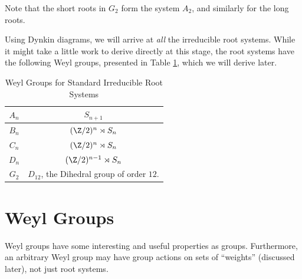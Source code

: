 \documentclass[11pt,leqno,oneside]{amsart}
\numberwithin{thm}{section}
\newcommand{\halfsum}{\rho}
\begin{document}
\begin{rmk}
  Note that the short roots in \(G_2\) form the system \(A_2\), and
  similarly for the long roots.
\end{rmk}
Using Dynkin diagrams, we will arrive at \emph{all}
the irreducible root systems. While it might take a little work to
derive directly at this stage, the root systems
have the following Weyl groups, presented in Table
\ref{tab:wely-groups}, which we will derive later. \\
\begin{table}
  \centering
  \begin{tabular}{|c|c|}
  \hline \(A_n\) & \(S_{n+1}\) \\
  \hline \(B_n\) & \((\Z/2)^n \rtimes S_n\) \\
  \hline \(C_n\) & \((\Z/2)^n \rtimes S_n\)\\
  \hline \(D_n\) & \((\Z/2)^{n-1} \rtimes S_n\) \\
  \hline \(G_2\) & \(D_{12}\), the Dihedral group of order \(12\). \\
  \hline
  \end{tabular}
  \caption{Weyl Groups for Standard Irreducible Root Systems}
  \label{tab:wely-groups}
\end{table}
\section{Weyl Groups}
Weyl groups have some interesting and useful properties as
groups. Furthermore, an arbitrary Weyl group may have group actions on
sets of ``weights'' (discussed later), not just root systems. \\
\end{document}
